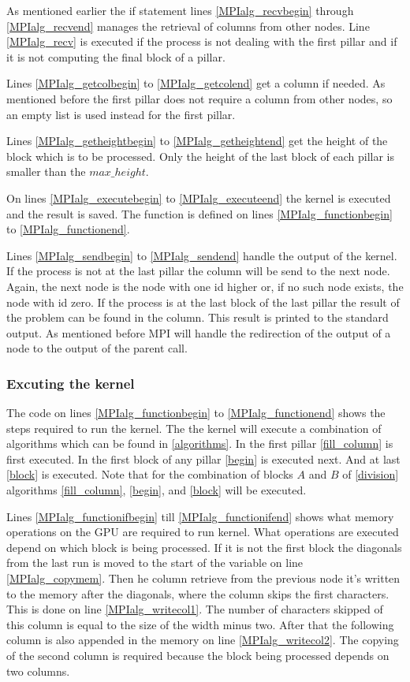 As mentioned earlier the if statement lines \ref{MPIalg_recvbegin} through \ref{MPIalg_recvend} manages the retrieval of columns from other nodes.
Line \ref{MPIalg_recv} is executed if the process is not dealing with the first pillar and if it is not computing the final block of a pillar.

Lines \ref{MPIalg_getcolbegin} to \ref{MPIalg_getcolend} get a column if needed.
As mentioned before the first pillar does not require a column from other nodes, so an empty list is used instead for the first pillar.

Lines \ref{MPIalg_getheightbegin} to \ref{MPIalg_getheightend} get the height of the block which is to be processed.
Only the height of the last block of each pillar is smaller than the $max\_height$.

On lines \ref{MPIalg_executebegin} to \ref{MPIalg_executeend} the kernel is executed and the result is saved.
The function is defined on lines \ref{MPIalg_functionbegin} to \ref{MPIalg_functionend}.

Lines \ref{MPIalg_sendbegin} to \ref{MPIalg_sendend} handle the output of the kernel.
If the process is not at the last pillar the column will be send to the next node.
Again, the next node is the node with one id higher or, if no such node exists, the node with id zero.
If the process is at the last block of the last pillar the result of the problem can be found in the column.
This result is printed to the standard output.
As mentioned before MPI will handle the redirection of the output of a node to the output of the parent call.

\subsubsection{Excuting the kernel}
The code on lines \ref{MPIalg_functionbegin} to \ref{MPIalg_functionend} shows the steps required to run the kernel.
The the kernel will execute a combination of algorithms which can be found in \cref{algorithms}.
In the first pillar \cref{fill_column} is first executed.
In the first block of any pillar \cref{begin} is executed next.
And at last \cref{block} is executed.
Note that for the combination of blocks $A$ and $B$ of \cref{division} algorithms \ref{fill_column}, \ref{begin}, and \ref{block} will be executed.

Lines \ref{MPIalg_functionifbegin} till \ref{MPIalg_functionifend} shows what memory operations on the GPU are required to run kernel.
What operations are executed depend on which block is being processed.
If it is not the first block the diagonals from the last run is moved to the start of the variable on line \ref{MPIalg_copymem}.
Then he column retrieve from the previous node it's written to the memory after the diagonals, where the column skips the first characters.
This is done on line \ref{MPIalg_writecol1}.
The number of characters skipped of this column is equal to the size of the width minus two.
After that the following column is also appended in the memory on line \ref{MPIalg_writecol2}.
The copying of the second column is required because the block being processed depends on two columns.

